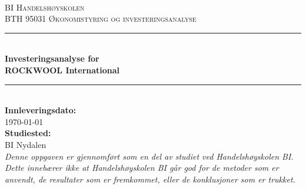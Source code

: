 \begin{titlepage}

\newcommand{\HRule}{\color{rockwoolcolor}\rule{\linewidth}{0.75mm}\color{black}} %

\center %
 
\ \\[1.5cm]
\textsc{\LARGE BI Handelshøyskolen}\\[1.5cm] %
\textsc{\Large BTH 95031 Økonomistyring og investeringsanalyse}\\[2.5cm] %



\HRule \\[0.4cm]
{ \huge \bfseries Investeringsanalyse for \\[0.5cm] ROCKWOOL International}\\[0.4cm] %
\HRule \\[2.5cm]
 

{\large \textbf{Innleveringsdato:}\\  \today}\\[1cm] %
{\large \textbf{Studiested:}\\  BI Nydalen}\\[3cm] %
 

\textit{Denne oppgaven er gjennomført som en del av studiet ved Handelshøyskolen BI. Dette innebærer
ikke at Handelshøyskolen BI går god for de metoder som er anvendt, de resultater som er
fremkommet, eller de konklusjoner som er trukket.}
\vfill %

\end{titlepage}